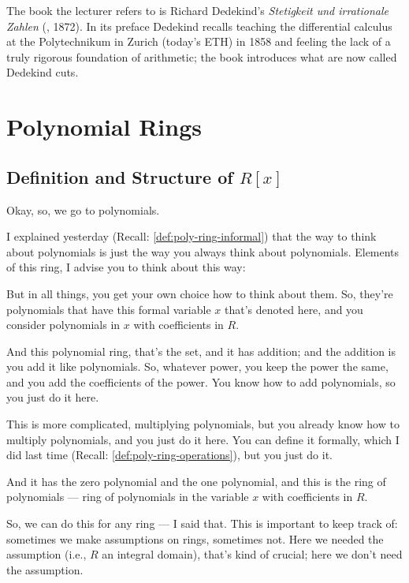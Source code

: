 \begin{aiNote}
The book the lecturer refers to is Richard Dedekind's \emph{Stetigkeit und irrationale Zahlen} (, 1872). In its preface Dedekind recalls teaching the differential calculus at the Polytechnikum in Zurich (today's ETH) in 1858 and feeling the lack of a truly rigorous foundation of arithmetic; the book introduces what are now called Dedekind cuts.
\end{aiNote}

\section{Polynomial Rings}

\subsection{Definition and Structure of \texorpdfstring{$R[x]$}{R[x]}}

\begin{speech}[00:04:45 - 00:06:30]
Okay, so, we go to polynomials.

I explained yesterday (Recall: \cref{def:poly-ring-informal}) that the way to think about polynomials is just the way you always think about polynomials. Elements of this ring, I advise you to think about this way: 

But in all things, you get your own choice how to think about them. So, they're polynomials that have this formal variable $x$ that's denoted here, and you consider polynomials in $x$ with coefficients in $R$.

And this polynomial ring, that's the set, and it has addition; and the addition is you add it like polynomials. So, whatever power, you keep the power the same, and you add the coefficients of the power. You know how to add polynomials, so you just do it here.

This is more complicated, multiplying polynomials, but you already know how to multiply polynomials, and you just do it here. You can define it formally, which I did last time (Recall: \cref{def:poly-ring-operations}), but you just do it.

And it has the zero polynomial and the one polynomial, and this is the ring of polynomials  --- ring of polynomials in the variable $x$ with coefficients in $R$.

So, we can do this for any ring --- I said that. This is important to keep track of: sometimes we make assumptions on rings, sometimes not. Here we needed the assumption (i.e., $R$ an integral domain), that's kind of crucial; here we don't need the assumption.
\end{speech}


